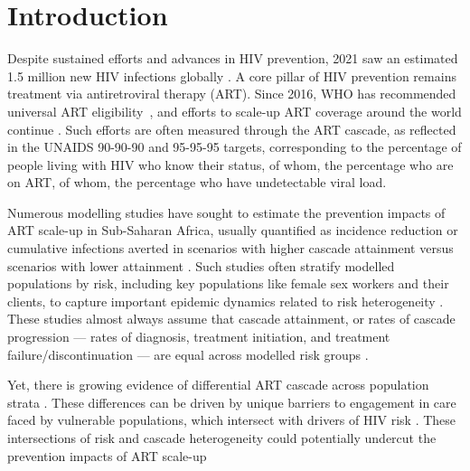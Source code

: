 \section{Introduction}\label{intro}
Despite sustained efforts and advances in HIV prevention,
2021 saw an estimated 1.5 million new HIV infections globally \cite{AIDSinfo}.
A core pillar of HIV prevention remains treatment via antiretroviral therapy (ART).
Since 2016, WHO has recommended universal ART eligibility~\cite{WHO2016ART},
and efforts to scale-up ART coverage around the world continue \cite{AIDSinfo}.
Such efforts are often measured through the ART cascade,
as reflected in the UNAIDS \mbox{90-90-90} \cite{909090} and \mbox{95-95-95} \cite{959595} targets,
corresponding to the percentage of people living with HIV who know their status,
of whom, the percentage who are on ART,
of whom, the percentage who have undetectable viral load.
\par
Numerous modelling studies have sought to estimate
the prevention impacts of ART scale-up in Sub-Saharan Africa,
usually quantified as incidence reduction or cumulative infections averted
in scenarios with higher cascade attainment versus scenarios with lower attainment
\cite{Delva2012,Eaton2014a,Knight2022-sr}.
Such studies often stratify modelled populations by risk,
including key populations like female sex workers and their clients,
to capture important epidemic dynamics related to risk heterogeneity
\cite{Knight2022-sr,Garnett1996}.
These studies almost always assume that cascade attainment, or rates of cascade progression
--- rates of diagnosis, treatment initiation, and treatment failure/discontinuation ---
are equal across modelled risk groups \cite{Knight2022-sr}.
\par
Yet, there is growing evidence of differential ART cascade across population strata
\cite{Hakim2018,Green2020}.
These differences can be driven by
unique barriers to engagement in care faced by vulnerable populations,
which intersect with drivers of HIV risk \cite{Wanyenze2016,Schwartz2017,Schmidt-Sane2022}.
These intersections of risk and cascade heterogeneity
could potentially undercut the prevention impacts of ART scale-up
